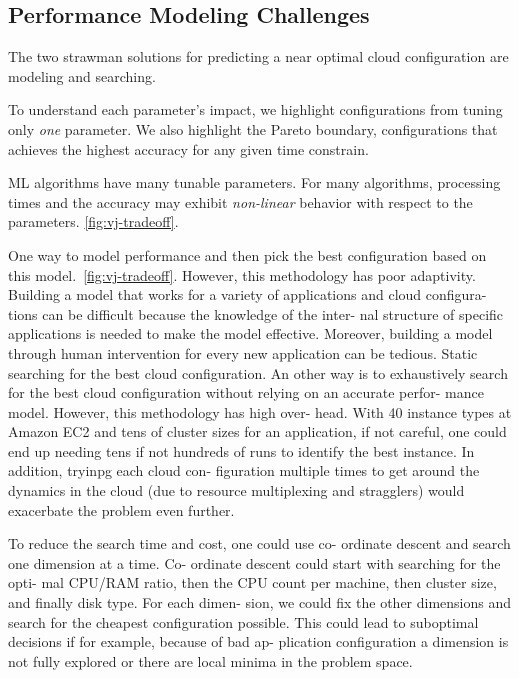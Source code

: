 
\subsection{Performance Modeling Challenges}
\label{sec:challenges}

The two strawman solutions for predicting a near optimal cloud configuration are
modeling and searching.

To understand each parameter's impact, we highlight
configurations from tuning only \textit{one} parameter. We also highlight the
Pareto boundary, configurations that achieves the highest accuracy for any given
time constrain.

ML algorithms have many tunable parameters. For many algorithms, processing
times and the accuracy may exhibit \textit{non-linear} behavior with respect to
the parameters. \autoref{fig:vj-tradeoff}.

 One way to
model performance and then pick the best configuration based on this
model.~\autoref{fig:vj-tradeoff}. However, this methodology has poor
adaptivity. Building a model that works for a variety of applications and cloud
configura- tions can be difficult because the knowledge of the inter- nal
structure of specific applications is needed to make the model
effective. Moreover, building a model through human intervention for every new
application can be tedious. Static searching for the best cloud
configuration. An other way is to exhaustively search for the best cloud
configuration without relying on an accurate perfor- mance model. However, this
methodology has high over- head. With 40 instance types at Amazon EC2 and tens
of cluster sizes for an application, if not careful, one could end up needing
tens if not hundreds of runs to identify the best instance. In addition, tryinpg
each cloud con- figuration multiple times to get around the dynamics in the
cloud (due to resource multiplexing and stragglers) would exacerbate the problem
even further.

To reduce the search time and cost, one could use co- ordinate descent and
search one dimension at a time. Co- ordinate descent could start with searching
for the opti- mal CPU/RAM ratio, then the CPU count per machine, then cluster
size, and finally disk type. For each dimen- sion, we could fix the other
dimensions and search for the cheapest configuration possible. This could lead
to suboptimal decisions if for example, because of bad ap- plication
configuration a dimension is not fully explored or there are local minima in the
problem space.

